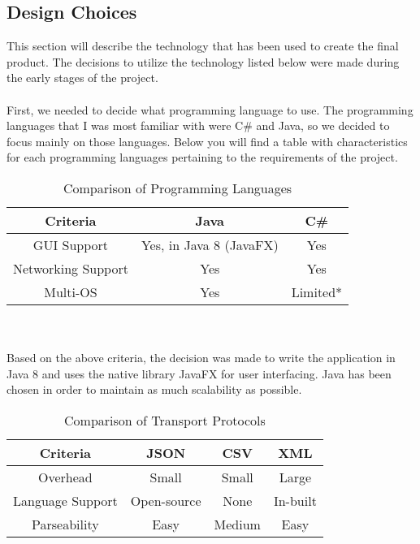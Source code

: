 \documentclass[11pt,a4paper]{article}
\begin{document}
\subsection{Design Choices}
This section will describe the technology that has been used to create the final product. The decisions to utilize the technology listed below were made during the early stages of the project.\\\\
First, we needed to decide what programming language to use. The programming languages that I was most familiar with were C\# and Java, so we decided to focus mainly on those languages. Below you will find a table with characteristics for each programming languages pertaining to the requirements of the project.
\begin{table}[h]
	\begin{center}
		\begin{tabular}{| c || c | c |}
			\hline
			Criteria & Java & C\# \\ \hline
			GUI Support & Yes, in Java 8 (JavaFX) & Yes \\ \hline
			Networking Support & Yes & Yes \\ \hline
			Multi-OS & Yes & Limited* \\ \hline
		\end{tabular}
		\caption{Comparison of Programming Languages}
	\end{center}
\end{table}\\\\
Based on the above criteria, the decision was made to write the application in Java 8 and uses the native library JavaFX for user interfacing. Java has been chosen in order to maintain as much scalability as possible.
\begin{table}[h]
	\begin{center}
		\begin{tabular}{| c || c | c | c |}
			\hline
			Criteria & JSON & CSV & XML \\ \hline
			Overhead & Small & Small & Large \\ \hline
			Language Support & Open-source & None & In-built \\ \hline
			Parseability & Easy & Medium & Easy \\ \hline
		\end{tabular}
		\caption{Comparison of Transport Protocols}
	\end{center}
\end{table}\\\\
\end{document}

